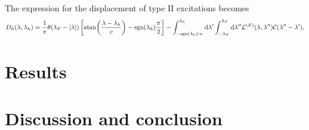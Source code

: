 \documentclass[11pt, a4paper,draft]{report} %
\newcommand{\inversetruncc}{\mathcal{L}}
\newcommand{\kernel}{\mathcal{C}}
\begin{document}
The expression for the displacement of type II excitations becomes
\begin{equation}
	D_h(\lambda, \lambda_h) = \frac{1}{\pi}\theta(\lambda_F - \lvert \lambda \rvert) \left[ \atan(\frac{\lambda-\lambda_h}{c}) - \textrm{sgn}(\lambda_h)\frac{\pi}{2}\right] - \int_{-\textrm{sgn}(\lambda_h)\infty}^{\lambda_h} \mathrm{d}\lambda' \int_{-\lambda_F}^{\lambda_F} \textrm{d} \lambda''  \inversetruncc^{(F)}(\lambda,\lambda'')\kernel(\lambda''-\lambda'),
\end{equation}

\chapter{Results}

\chapter{Discussion and conclusion}




\end{document}
